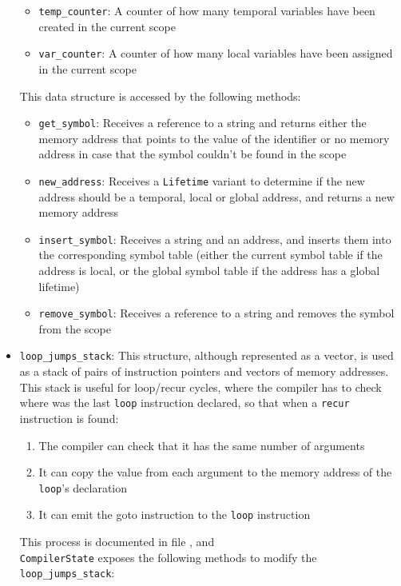 \documentclass[11pt]{scrreprt}
\begin{document}
\begin{itemize}
\begin{itemize}
    \item \texttt{temp\_counter}: A counter of how many temporal variables have been created in the current scope
    \item \texttt{var\_counter}: A counter of how many local variables have been assigned in the current scope
  \end{itemize}
  This data structure is accessed by the following methods:
  \begin{itemize}
    \item \texttt{get\_symbol}: Receives a reference to a string and returns either the memory address that points to the value of the identifier or no memory address in case that the symbol couldn't be found in the scope
    \item \texttt{new\_address}: Receives a \texttt{Lifetime} variant to determine if the new address should be a temporal, local or global address, and returns a new memory address
    \item \texttt{insert\_symbol}: Receives a string and an address, and inserts them into the corresponding symbol table (either the current symbol table if the address is local, or the global symbol table if the address has a global lifetime)
    \item \texttt{remove\_symbol}: Receives a reference to a string and removes the symbol from the scope
  \end{itemize}
  \item \texttt{loop\_jumps\_stack}: This structure, although represented as a vector, is used as a stack of pairs of instruction pointers and vectors of memory addresses. This stack is useful for loop/recur cycles, where the compiler has to check where was the last \texttt{loop} instruction declared, so that when a \texttt{recur} instruction is found:
  \begin{enumerate}
    \item The compiler can check that it has the same number of arguments
    \item It can copy the value from each argument to the memory address of the \texttt{loop}'s declaration
    \item It can emit the goto instruction to the \texttt{loop} instruction
  \end{enumerate}
  This process is documented in file , and\\\texttt{CompilerState} exposes the following methods to modify the \texttt{loop\_jumps\_stack}:
  \begin{itemize}

\end{itemize}
\end{itemize}
\end{document}
